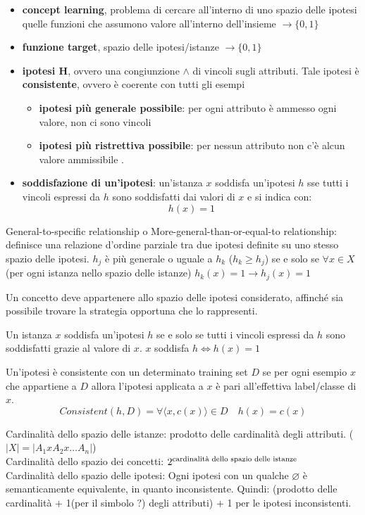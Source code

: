 \begin{itemize}
    \item \textbf{concept learning}, problema di cercare all’interno di uno spazio delle ipotesi quelle funzioni che assumono valore all’interno dell’insieme $\to \{0,1\}$
    \item \textbf{funzione target}, spazio delle ipotesi/istanze $\to \{0,1\}$
    \item \textbf{ipotesi H}, ovvero una congiunzione $\land$ di vincoli sugli attributi. Tale ipotesi è \textbf{consistente}, ovvero è coerente con tutti gli esempi 
        \begin{itemize}
            \item \textbf{ipotesi più generale possibile}: per ogni attributo è ammesso ogni valore, non ci sono vincoli
            \item \textbf{ipotesi più ristrettiva possibile}: per nessun attributo non c’è alcun valore ammissibile .
        \end{itemize}
    \item \textbf{soddisfazione di un'ipotesi}: un'istanza $x$ soddisfa un'ipotesi $h$ sse tutti i vincoli espressi da $h$ sono soddisfatti dai valori di $x$ e si indica con: \[h(x)=1\]
\end{itemize}

General-to-specific relationship o More-general-than-or-equal-to relationship: definisce una relazione d’ordine parziale tra due ipotesi definite su uno stesso spazio delle ipotesi. $h_j$ è più generale o uguale a  $h_k$ ($h_k \geq h_j$) se e solo se $\forall x \in X$ (per ogni istanza nello spazio delle istanze) $h_k(x) = 1 \to h_j(x) = 1$

Un concetto deve appartenere allo spazio delle ipotesi considerato, affinché sia possibile trovare la strategia opportuna che lo rappresenti. 

Un istanza $x$ soddisfa un’ipotesi $h$  se e solo se tutti i vincoli espressi da $h$ sono soddisfatti grazie al valore di $x$. $x$ soddisfa $h \iff h(x) = 1$

Un’ipotesi è consistente con un determinato training set $D$ se per ogni esempio $x$ che appartiene a $D$ allora l’ipotesi applicata a $x$ è pari all’effettiva label/classe di $x$.
$$Consistent(h,D) = \forall \langle x,c(x) \rangle \in D \quad h(x) = c(x) $$ 

Cardinalità dello spazio delle istanze: prodotto delle cardinalità degli attributi. ($|X| = |A_1 x A_2 x \dots A_n|$)\\
Cardinalità dello spazio dei concetti: $2^{\textnormal{cardinalità dello spazio delle istanze}}$ \\
Cardinalità dello spazio delle ipotesi: Ogni ipotesi con un qualche $\varnothing$ è semanticamente equivalente, in quanto inconsistente. Quindi: (prodotto delle cardinalità $+$ 1(per il simbolo $?$) degli attributi) $+$ 1 per le ipotesi inconsistenti. 